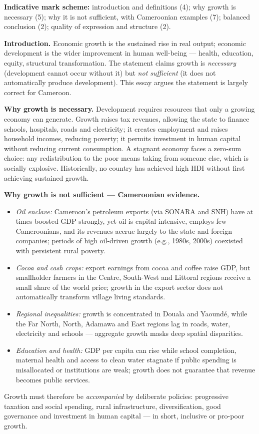 \documentclass[11pt]{article}
\begin{document}
\begin{corrige}
\textbf{Indicative mark scheme:} introduction and definitions (4); why growth is necessary (5); why it is not sufficient, with Cameroonian examples (7); balanced conclusion (2); quality of expression and structure (2).

\textbf{Introduction.} Economic growth is the sustained rise in real output; economic development is the wider improvement in human well-being — health, education, equity, structural transformation. The statement claims growth is \emph{necessary} (development cannot occur without it) but \emph{not sufficient} (it does not automatically produce development). This essay argues the statement is largely correct for Cameroon.

\textbf{Why growth is necessary.} Development requires resources that only a growing economy can generate. Growth raises tax revenues, allowing the state to finance schools, hospitals, roads and electricity; it creates employment and raises household incomes, reducing poverty; it permits investment in human capital without reducing current consumption. A stagnant economy faces a zero-sum choice: any redistribution to the poor means taking from someone else, which is socially explosive. Historically, no country has achieved high HDI without first achieving sustained growth.

\textbf{Why growth is not sufficient — Cameroonian evidence.}
\begin{itemize}
\item \emph{Oil enclave:} Cameroon's petroleum exports (via SONARA and SNH) have at times boosted GDP strongly, yet oil is capital-intensive, employs few Cameroonians, and its revenues accrue largely to the state and foreign companies; periods of high oil-driven growth (e.g., 1980s, 2000s) coexisted with persistent rural poverty.
\item \emph{Cocoa and cash crops:} export earnings from cocoa and coffee raise GDP, but smallholder farmers in the Centre, South-West and Littoral regions receive a small share of the world price; growth in the export sector does not automatically transform village living standards.
\item \emph{Regional inequalities:} growth is concentrated in Douala and Yaoundé, while the Far North, North, Adamawa and East regions lag in roads, water, electricity and schools — aggregate growth masks deep spatial disparities.
\item \emph{Education and health:} GDP per capita can rise while school completion, maternal health and access to clean water stagnate if public spending is misallocated or institutions are weak; growth does not guarantee that revenue becomes public services.
\end{itemize}
Growth must therefore be \emph{accompanied} by deliberate policies: progressive taxation and social spending, rural infrastructure, diversification, good governance and investment in human capital — in short, inclusive or pro-poor growth.


\end{corrige}
\end{document}
